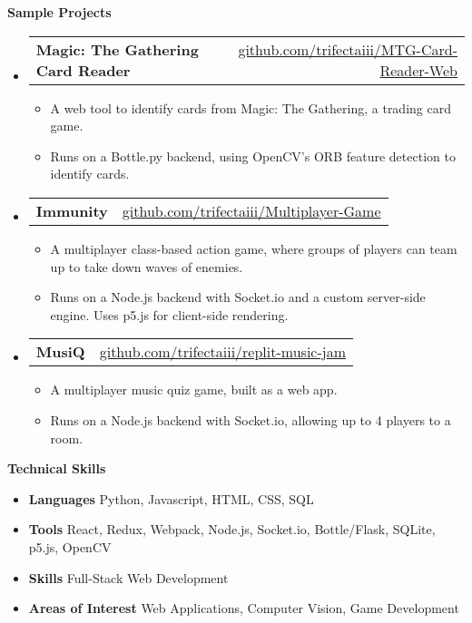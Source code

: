 \documentclass[letterpaper,12pt]{article}[leftmargin=*]
\makeatletter
\def \entryspacing {-0pt}
\renewcommand{\section}[2]{\vspace{5pt}
  \colorbox{secondary}{\color{white}\raggedbottom\normalsize\textbf{{#1}{\hspace{7pt}#2}}}
}
\newcommand{\resumeEntryStart}{\begin{itemize}[leftmargin=2.5mm]}
\newcommand{\resumeEntryEnd}{\end{itemize}\vspace{\entryspacing}}
\newcommand{\resumeItemListStart}{\begin{itemize}[leftmargin=4.5mm]}
\newcommand{\resumeItemListEnd}{\end{itemize}}
\newcommand{\resumeItem}[1]{
  \item{%
    {#1 \vspace{-2pt}}
  }
}
\newcommand{\resumeEntryTD}[2]{
  \vspace{-1pt}\item[]
    \begin{tabular*}{0.97\textwidth}{l@{\extracolsep{\fill}}r}
      \textbf{\color{primary}#1} & {\firabook\color{accent}\small#2} \\
    \end{tabular*}\vspace{-6pt}
}
\newcommand{\resumeEntryS}[2]{
  \item[]\small{
    \textbf{\color{primary}#1 }{ #2 \vspace{-6pt}}
  }
}
\makeatother
\begin{document}
\section{\faFlask}{Sample Projects}

  \resumeEntryStart
    \resumeEntryTD
      {Magic: The Gathering Card Reader}{\href{https://github.com/trifectaiii/MTG-Card-Reader-Web}{github.com/trifectaiii/MTG-Card-Reader-Web}}
    \resumeItemListStart
      \resumeItem {A web tool to identify cards from Magic: The Gathering, a trading card game.}
      \resumeItem {Runs on a Bottle.py backend, using OpenCV's ORB feature detection to identify cards.}
    \resumeItemListEnd
  \resumeEntryEnd
  
  \resumeEntryStart
    \resumeEntryTD
      {Immunity}{\href{https://github.com/trifectaiii/Multiplayer-Game}{github.com/trifectaiii/Multiplayer-Game}}
    \resumeItemListStart
      \resumeItem {A multiplayer class-based action game, where groups of players can team up to take down waves of enemies.}
      \resumeItem {Runs on a Node.js backend with Socket.io and a custom server-side engine. Uses p5.js for client-side rendering.}
    \resumeItemListEnd
  \resumeEntryEnd

  \resumeEntryStart
    \resumeEntryTD
      {MusiQ}{\href{https://github.com/TrifectaIII/replit-music-jam}{github.com/trifectaiii/replit-music-jam}}
    \resumeItemListStart
      \resumeItem {A multiplayer music quiz game, built as a web app.}
      \resumeItem {Runs on a Node.js backend with Socket.io, allowing up to 4 players to a room.}
    \resumeItemListEnd
  \resumeEntryEnd

\section{\faGears}{Technical Skills}
 \resumeEntryStart
  \resumeEntryS{Languages } {Python, Javascript, HTML, CSS, SQL}
  \resumeEntryS{Tools } {React, Redux, Webpack, Node.js, Socket.io, Bottle/Flask, SQLite, p5.js, OpenCV}
  \resumeEntryS{Skills } {Full-Stack Web Development}
  \resumeEntryS{Areas of Interest } {Web Applications, Computer Vision, Game Development}
 \resumeEntryEnd
 
\begin{center}
\begin{scriptsize}
\end{scriptsize}
\end{center}
\end{document}
